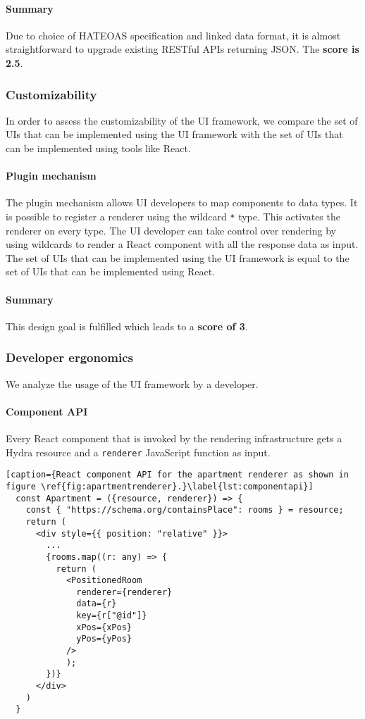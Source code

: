 \paragraph{Summary}
Due to choice of HATEOAS specification and linked data format, it is almost straightforward to upgrade existing RESTful APIs returning JSON. The \textbf{score is 2.5}.

\subsubsection{Customizability}
In order to assess the customizability of the UI framework, we compare the set of UIs that can be implemented using the UI framework with the set of UIs that can be implemented using tools like React.

\paragraph{Plugin mechanism}
The plugin mechanism allows UI developers to map components to data types. It is possible to register a renderer using the wildcard \lstinline{*} type. This activates the renderer on every type. The UI developer can take control over rendering by using wildcards to render a React component with all the response data as input. The set of UIs that can be implemented using the UI framework is equal to the set of UIs that can be implemented using React.

\paragraph{Summary}
This design goal is fulfilled which leads to a \textbf{score of 3}.

\subsubsection{Developer ergonomics}
We analyze the usage of the UI framework by a developer.

\paragraph{Component API}
Every React component that is invoked by the rendering infrastructure gets a Hydra resource and a \lstinline{renderer} JavaScript function as input.

\lstset{language=JSON}
\begin{lstlisting}[caption={React component API for the apartment renderer as shown in figure \ref{fig:apartmentrenderer}.}\label{lst:componentapi}]
  const Apartment = ({resource, renderer}) => {
    const { "https://schema.org/containsPlace": rooms } = resource;
    return (
      <div style={{ position: "relative" }}>
        ...
        {rooms.map((r: any) => {
          return (
            <PositionedRoom
              renderer={renderer}
              data={r}
              key={r["@id"]}
              xPos={xPos}
              yPos={yPos}
            />
            );
        })}
      </div>
    )
  }
\end{lstlisting}

